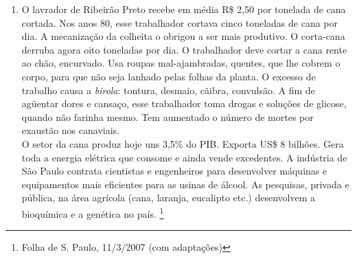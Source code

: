 \documentclass[10pt,a4paper]{article}
\begin{document}
\begin{multicols}{2}
\begin{enumerate}
Com base na leitura do texto e na an\'alise dos três mapas identifique a alternativa correta:

		\begin{enumerate}
		\item o texto e os mapas evidenciam que n\~ao existe  rela\c{c}\~ao entre a taxa de mortalidade e a renda da popula\c{c}\~ao negra.
		\item os mapas indicam que as maiores rendas (superior a 20 sal\'arios m\'inimos) apresentam-se na regi\~ao central da cidade de S\~ao Paulo coincidindo com a localiza\c{c}\~ao do maior percentual da popula\c{c}\~ao negra.
		\item a denominada regi\~ao perif\'erica, ou afastada do centro, abriga o alto \'indice de urbaniza\c{c}\~ao planejada e concretizada desde 1930.
		\item a leitura do texto e a observa\c{c}\~ao dos mapas permitem compreender que as maiores rendas concentram-se na regi\~ao central da cidade aonde encontramos os chamados bairros-chiques e planejados, como Jardim Paulista, Moema, Vila Mariana...
		\item existe apenas uma grande coincidência entre os mapas e o texto, pois n\~ao h\'a rela\c{c}\~ao social e hist\'orica  entre a urbaniza\c{c}\~ao planejada e a n\~ao planejada, a baixa renda da popula\c{c}\~ao e violência na cidade.
		\end{enumerate}

	\item O lavrador de Ribeir\~ao Preto recebe em m\'edia R\$ 2,50 por tonelada de cana cortada. Nos anos 80, esse trabalhador cortava cinco toneladas de cana por dia. A mecaniza\c{c}\~ao da colheita o obrigou a ser mais produtivo. O corta-cana derruba agora oito toneladas por dia. O trabalhador deve cortar a cana rente ao ch\~ao, encurvado. Usa roupas mal-ajambradas, quentes, que lhe cobrem o corpo, para que n\~ao seja lanhado pelas folhas da planta. O excesso de trabalho causa a \emph{birola}: tontura, desmaio, c\~aibra, convuls\~ao. A fim de agüentar dores e cansa\c{c}o, esse trabalhador toma drogas e solu\c{c}ões de glicose, quando n\~ao farinha mesmo. Tem aumentado o n\'umero de mortes por exaust\~ao nos canaviais. \\
O setor da cana produz hoje uns 3,5\% do PIB. Exporta US\$ 8 bilhões. Gera toda a energia el\'etrica que consome e ainda vende excedentes. A ind\'ustria de S\~ao Paulo contrata cientistas e engenheiros para desenvolver m\'aquinas e equipamentos mais eficientes para as usinas de \'alcool. As pesquisas, privada e p\'ublica, na \'area agr\'icola (cana, laranja, eucalipto etc.) desenvolvem a bioqu\'imica e a gen\'etica no pa\'is. \footnote{Folha de S. Paulo, 11/3/2007 (com adapta\c{c}ões)}


\end{enumerate}
\end{multicols}
\end{document}
